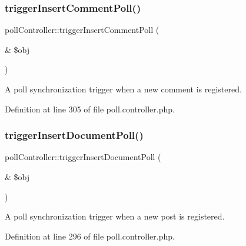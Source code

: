 \hypertarget{classpollController_a9676dc5c2762bf1c7818828d6ccf3efa}{}\label{classpollController_a9676dc5c2762bf1c7818828d6ccf3efa} 
\subsubsection{\texorpdfstring{trigger\+Insert\+Comment\+Poll()}{triggerInsertCommentPoll()}}
{\footnotesize\ttfamily poll\+Controller\+::trigger\+Insert\+Comment\+Poll (\begin{DoxyParamCaption}\item[{\&}]{\$obj }\end{DoxyParamCaption})}



A poll synchronization trigger when a new comment is registered. 



Definition at line 305 of file poll.\+controller.\+php.

\hypertarget{classpollController_ae2ad5e6f6c89c2aee07208a8a66ef5e7}{}\label{classpollController_ae2ad5e6f6c89c2aee07208a8a66ef5e7} 
\subsubsection{\texorpdfstring{trigger\+Insert\+Document\+Poll()}{triggerInsertDocumentPoll()}}
{\footnotesize\ttfamily poll\+Controller\+::trigger\+Insert\+Document\+Poll (\begin{DoxyParamCaption}\item[{\&}]{\$obj }\end{DoxyParamCaption})}



A poll synchronization trigger when a new post is registered. 



Definition at line 296 of file poll.\+controller.\+php.

\hypertarget{classpollController_a2f3da10fbc7dc8bf7dddaf0e81e152ab}{}\label{classpollController_a2f3da10fbc7dc8bf7dddaf0e81e152ab} 
